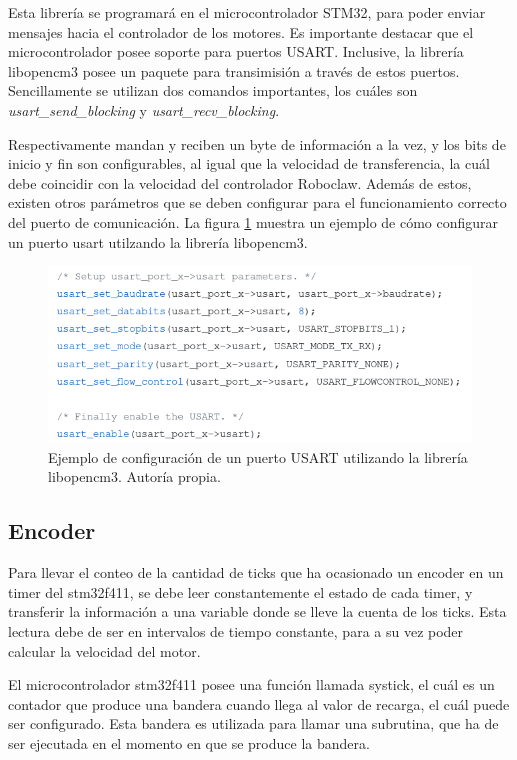 Esta librería se programará en el microcontrolador STM32, para poder enviar mensajes hacia el controlador de los motores. Es importante destacar que el microcontrolador posee soporte para puertos USART. Inclusive, la librería libopencm3 posee un paquete para transimisión a través de estos puertos. Sencillamente se utilizan dos comandos importantes, los cuáles son \textit{usart\_send\_blocking} y \textit{usart\_recv\_blocking}.

Respectivamente mandan y reciben un byte de información a la vez, y los bits de inicio y fin son configurables, al igual que la velocidad de transferencia, la cuál debe coincidir con la velocidad del controlador Roboclaw. Además de estos, existen otros parámetros que se deben configurar para el funcionamiento correcto del puerto de comunicación. La figura \ref{F:usart} muestra un ejemplo de cómo configurar un puerto usart utilzando la librería libopencm3.

\begin{figure}[H]
\centering
\includegraphics[scale=0.5]{imagenes/usart.png}
\caption{Ejemplo de configuración de un puerto USART utilizando la librería libopencm3. Autoría propia.}
\label{F:usart}
\end{figure}

\subsection{Encoder}

Para llevar el conteo de la cantidad de ticks que ha ocasionado un encoder en un timer del stm32f411, se debe leer constantemente el estado de cada timer, y transferir la información a una variable donde se lleve la cuenta de los ticks. Esta lectura debe de ser en intervalos de tiempo constante, para a su vez poder calcular la velocidad del motor.

El microcontrolador stm32f411 posee una función llamada systick, el cuál es un contador que produce una bandera cuando llega al valor de recarga, el cuál puede ser configurado. Esta bandera es utilizada para llamar una subrutina, que ha de ser ejecutada en el momento en que se produce la bandera.

